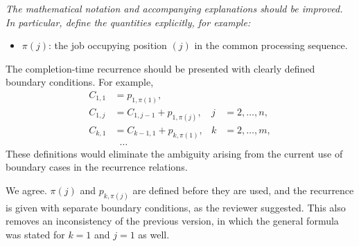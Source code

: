\documentclass[12pt]{article}
\newenvironment{rc}[1]{\par\medskip\noindent\itshape\renewcommand{\emph}[1]{\textbf{##1}}\ignorespaces}{\par}
\newcommand{\answer}[1]{\par\smallskip\noindent #1\par}
\begin{document}
\begin{rc}{R2.2c --- Notation and boundary conditions of the recurrence}
The mathematical notation and accompanying explanations should be improved. In particular, define the quantities explicitly, for example:
\begin{itemize}[label=-]
\item $\pi(j)$: the job occupying position $(j)$ in the common processing sequence.
\end{itemize}
The completion-time recurrence should be presented with clearly defined boundary conditions. For example,
\begin{align*}
C_{1,1} &= p_{1,\pi(1)},\\
C_{1,j} &= C_{1,j-1}+p_{1,\pi(j)}, & j &= 2,\ldots,n,\\
C_{k,1} &= C_{k-1,1}+p_{k,\pi(1)}, & k &= 2,\ldots,m,\\
&\;\;\ldots
\end{align*}
These definitions would eliminate the ambiguity arising from the current use of boundary cases in the recurrence relations.
\end{rc}
\answer{We agree. $\pi(j)$ and $p_{k,\pi(j)}$ are defined before they are used, and the recurrence is given with separate boundary conditions, as the reviewer suggested. This also removes an inconsistency of the previous version, in which the general formula was stated for $k=1$ and $j=1$ as well.}
\end{document}
